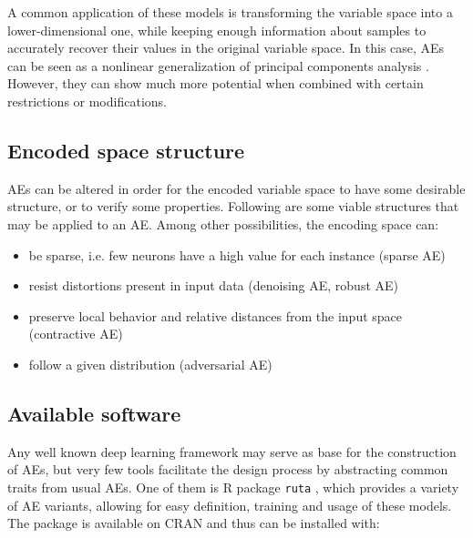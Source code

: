 \documentclass[
	fontsize=11pt, %
	twoside=false, %
	open=any, %
	secnumdepth=1, %
]{kaobook}
\begin{document}
A common application of these models is transforming the variable space into a lower-dimensional one, while keeping enough information about samples to accurately recover their values in the original variable space. In this case, AEs can be seen as a nonlinear generalization of principal components analysis \cite{ANNsPCA}. However, they can show much more potential when combined with certain restrictions or modifications.


\subsection{Encoded space structure}

AEs can be altered in order for the encoded variable space to have some desirable structure, or to verify some properties. Following are some viable structures that may be applied to an AE. Among other possibilities, the encoding space can:  %

\begin{itemize}
    \item be sparse, i.e. few neurons have a high value for each instance (sparse AE)
    \item resist distortions present in input data (denoising AE, robust AE)
    \item preserve local behavior and relative distances from the input space (contractive AE)
    \item follow a given distribution (adversarial AE)
\end{itemize}


\subsection{Available software}

Any well known deep learning framework may serve as base for the construction of AEs, but very few tools facilitate the design process by abstracting common traits from usual AEs. One of them is R package \texttt{ruta} \cite{ruta}, which provides a variety of AE variants, allowing for easy definition, training and usage of these models. The package is available on CRAN and thus can be installed with:
\end{document}
